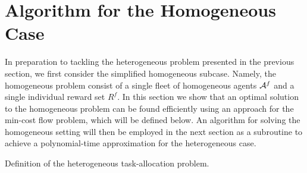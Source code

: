 \documentclass[conference]{IEEEtran}
\begin{document}

\section{Algorithm for the Homogeneous Case}\label{sec:homogeneous}
In preparation to tackling the heterogeneous problem presented in the previous section, we first consider the simplified homogeneous subcase. Namely, the homogeneous problem consist of a single fleet of homogeneous agents $\mathcal{A}^f$ and a single individual reward set $R^f$. In this section we show that an optimal solution to the homogeneous problem can be found efficiently using an approach for the min-cost flow problem, which will be defined below. An algorithm for solving the homogeneous setting will then be employed in the next section as a subroutine to achieve a polynomial-time approximation for the heterogeneous case.

\begin{table}[!ht]
\label{tbl:homogeneous}
\noindent{}
\vspace{5pt}
\caption{Definition of the heterogeneous task-allocation problem.}
\end{table}
\end{document}
